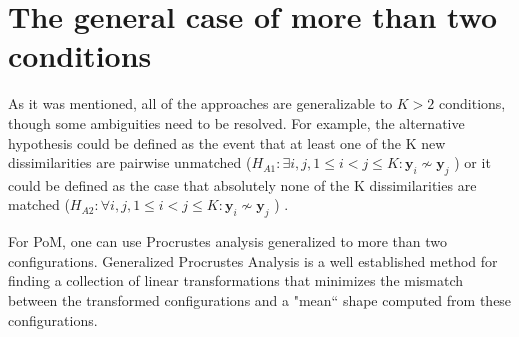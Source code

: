\documentclass[11pt]{article} %
\begin{document}
\section{The general case of more than two conditions}


As it was mentioned, all of the approaches are generalizable to $K>2$ conditions, though some ambiguities need to be resolved. For example,  the alternative hypothesis could be  defined as the event that at least one of the K new dissimilarities are pairwise unmatched ($ H_{A1}: \exists i, j , 1\leq i < j \leq K :\bm{y}_{i} \nsim \bm{y}_{j} $ ) or it could be defined as the case that absolutely none of the K dissimilarities are matched   ($H_{A2}: \forall i, j , 1\leq i < j \leq K :\bm{y}_{i} \nsim \bm{y}_{j}$ )  .

For PoM, one can use Procrustes analysis  generalized to more than two configurations. Generalized Procrustes Analysis \cite{GPCA} is a well established method for finding a collection of linear transformations that minimizes the mismatch between the transformed configurations and a "mean`` shape computed from these configurations. 
\end{document}
